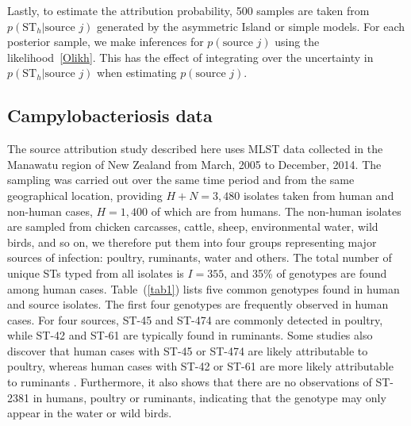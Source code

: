 \documentclass[times, doublespace]{simauth}%
\begin{document}
Lastly, to estimate the attribution probability, 500 samples are taken from $p(\text{ST}_h \vert \text{source }j)$ generated by the asymmetric Island or simple models. For each posterior sample, we make inferences for $p(\text{source }j)$ using the likelihood~\eqref{Olikh}. This has the effect of integrating over the uncertainty in $p(\text{ST}_h \vert \text{source }j)$ when estimating $p(\text{source }j)$.

\subsection{Campylobacteriosis data}

The source attribution study described here uses MLST data collected in the Manawatu region of New Zealand from March, 2005 to December, 2014. The sampling was carried out over the same time period and from the same geographical location, providing $H+N=3,480$ isolates taken from human and non-human cases, $H=1,400$ of which are from humans. The non-human isolates are sampled from chicken carcasses, cattle, sheep, environmental water, wild birds, and so on, we therefore put them into four groups representing major sources of infection: poultry, ruminants, water and others. The total number of unique STs typed from all isolates is $I=355$, and 35\% of genotypes are found among human cases. Table~(\ref{tab1}) lists five common genotypes found in human and source isolates. The first four genotypes are frequently observed in human cases. For four sources, ST-45 and ST-474 are commonly detected in poultry, while ST-42 and ST-61 are typically found in ruminants. Some studies also discover that human cases with ST-45 or ST-474 are likely attributable to poultry, whereas human cases with ST-42 or ST-61 are more likely attributable to ruminants \cite{Muell, Coll, Cart}. Furthermore, it also shows that there are no observations of ST-2381 in humans, poultry or ruminants, indicating that the genotype may only appear in the water or wild birds.
\end{document}

